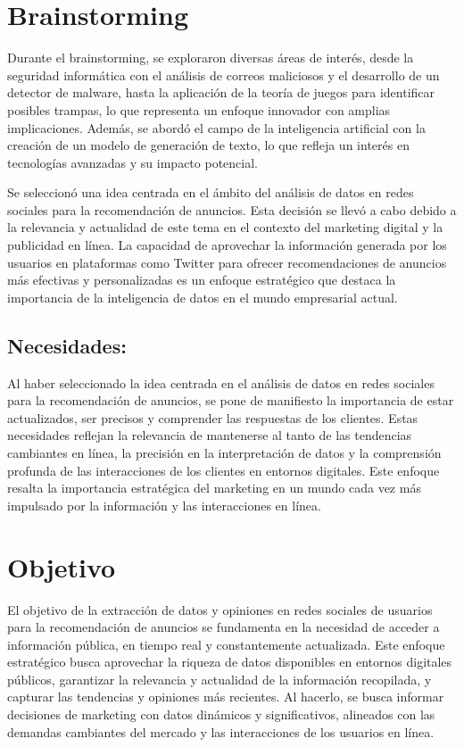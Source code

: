 \documentclass[
  letterpaper,
  DIV=11,
  numbers=noendperiod]{scrartcl}
\begin{document}
\section{Brainstorming}\label{brainstorming}

Durante el brainstorming, se exploraron diversas áreas de interés, desde
la seguridad informática con el análisis de correos maliciosos y el
desarrollo de un detector de malware, hasta la aplicación de la teoría
de juegos para identificar posibles trampas, lo que representa un
enfoque innovador con amplias implicaciones. Además, se abordó el campo
de la inteligencia artificial con la creación de un modelo de generación
de texto, lo que refleja un interés en tecnologías avanzadas y su
impacto potencial.

Se seleccionó una idea centrada en el ámbito del análisis de datos en
redes sociales para la recomendación de anuncios. Esta decisión se llevó
a cabo debido a la relevancia y actualidad de este tema en el contexto
del marketing digital y la publicidad en línea. La capacidad de
aprovechar la información generada por los usuarios en plataformas como
Twitter para ofrecer recomendaciones de anuncios más efectivas y
personalizadas es un enfoque estratégico que destaca la importancia de
la inteligencia de datos en el mundo empresarial actual.

\subsection{Necesidades:}\label{necesidades}

Al haber seleccionado la idea centrada en el análisis de datos en redes
sociales para la recomendación de anuncios, se pone de manifiesto la
importancia de estar actualizados, ser precisos y comprender las
respuestas de los clientes. Estas necesidades reflejan la relevancia de
mantenerse al tanto de las tendencias cambiantes en línea, la precisión
en la interpretación de datos y la comprensión profunda de las
interacciones de los clientes en entornos digitales. Este enfoque
resalta la importancia estratégica del marketing en un mundo cada vez
más impulsado por la información y las interacciones en línea.

\section{Objetivo}\label{objetivo}

El objetivo de la extracción de datos y opiniones en redes sociales de
usuarios para la recomendación de anuncios se fundamenta en la necesidad
de acceder a información pública, en tiempo real y constantemente
actualizada. Este enfoque estratégico busca aprovechar la riqueza de
datos disponibles en entornos digitales públicos, garantizar la
relevancia y actualidad de la información recopilada, y capturar las
tendencias y opiniones más recientes. Al hacerlo, se busca informar
decisiones de marketing con datos dinámicos y significativos, alineados
con las demandas cambiantes del mercado y las interacciones de los
usuarios en línea.
\end{document}
